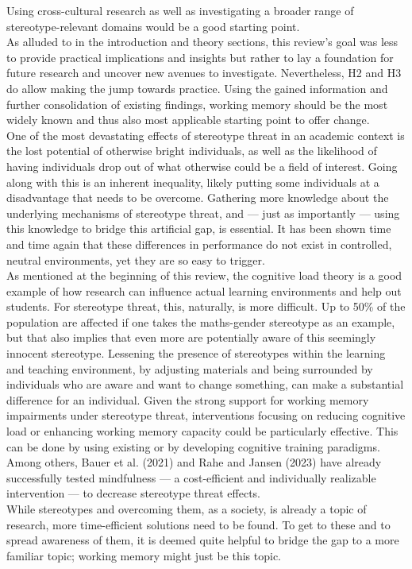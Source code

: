 \documentclass[
  stu, a4paper,floatsintext]{apa7}
\begin{document}
Using cross-cultural research as well as investigating a broader range of stereotype-relevant domains would be a good starting point.\\
As alluded to in the introduction and theory sections, this review's goal was less to provide practical implications and insights but rather to lay a foundation for future research and uncover new avenues to investigate.
Nevertheless, H2 and H3 do allow making the jump towards practice.
Using the gained information and further consolidation of existing findings, working memory should be the most widely known and thus also most applicable starting point to offer change.\\
One of the most devastating effects of stereotype threat in an academic context is the lost potential of otherwise bright individuals, as well as the likelihood of having individuals drop out of what otherwise could be a field of interest.
Going along with this is an inherent inequality, likely putting some individuals at a disadvantage that needs to be overcome.
Gathering more knowledge about the underlying mechanisms of stereotype threat, and --- just as importantly --- using this knowledge to bridge this artificial gap, is essential.
It has been shown time and time again that these differences in performance do not exist in controlled, neutral environments, yet they are so easy to trigger.\\
As mentioned at the beginning of this review, the cognitive load theory is a good example of how research can influence actual learning environments and help out students.
For stereotype threat, this, naturally, is more difficult.
Up to 50\% of the population are affected if one takes the maths-gender stereotype as an example, but that also implies that even more are potentially aware of this seemingly innocent stereotype.
Lessening the presence of stereotypes within the learning and teaching environment, by adjusting materials and being surrounded by individuals who are aware and want to change something, can make a substantial difference for an individual.
Given the strong support for working memory impairments under stereotype threat, interventions focusing on reducing cognitive load or enhancing working memory capacity could be particularly effective.
This can be done by using existing or by developing cognitive training paradigms.
Among others, Bauer et al. (2021) and Rahe and Jansen (2023) have already successfully tested mindfulness --- a cost-efficient and individually realizable intervention --- to decrease stereotype threat effects.\\
While stereotypes and overcoming them, as a society, is already a topic of research, more time-efficient solutions need to be found.
To get to these and to spread awareness of them, it is deemed quite helpful to bridge the gap to a more familiar topic; working memory might just be this topic.
\end{document}
